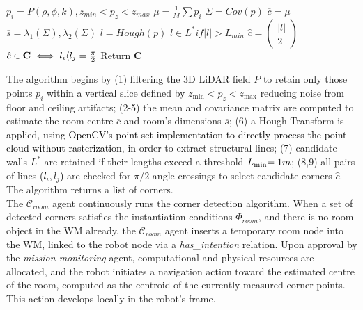 \documentclass[10pt,a4paper]{article}
\begin{document}
\begin{algorithm}[h!]
\caption{Corners Detector Algorithm}
\begin{algorithmic}[1]
    \State $p_i=P(\rho, \phi, k),  z_{min} <  p_z < z_{max}$
    \State $\mu = \frac{1}{M}\sum{p_i}$
    \State $\Sigma = Cov(p)$
    \State $\overline{c} = \mu$
    \State $\overline{s}=\lambda_1(\Sigma), \lambda_2(\Sigma)$
    \State $l=Hough(p)$
    \State $l\in L^* if |l| > L_{min}$
    \State $\hat{c}=\begin{pmatrix} |l| \\ 2 \end{pmatrix}$
    \State $\hat{c}\in \mathbf{C} \iff \textcolor{black}{l_i\langle l_j}=\frac{\pi}{2}$
    \State Return $\mathbf{C}$
\end{algorithmic}
\label{alg:room_detector}
\end{algorithm}

The algorithm begins by (1) filtering the 3D LiDAR field $P$ to retain only those points \(p_i\) within a vertical slice defined by \(z_{\min} < p_z < z_{\max}\) reducing noise from floor and ceiling artifacts; (2-5) the mean and covariance matrix are computed to estimate the room centre \(\overline{c}\) and room's dimensions $\overline{s}$; (6) a Hough Transform is applied, \textcolor{black}{using OpenCV’s point set implementation to directly process the point cloud without rasterization}, in order to extract structural lines; (7) candidate walls \(L^*\) are retained if their lengths exceed a threshold $L_{\text{min}}\textcolor{black}{=1m}$; (8,9) all pairs of lines \textcolor{black}{($l_i, l_j$)} are checked for $\pi/2$ angle crossings to select candidate corners \(\hat{c}\). The algorithm returns a list of corners. \\

%
%
%
%
%
%
%
%
%
%
%
%
%
%
%
%

The $\mathcal{C}_{room}$ agent continuously runs the corner detection algorithm.  When a set of detected corners satisfies the instantiation conditions \( \Phi_{room} \), and there is no room object in the WM already, the $\mathcal{C}_{room}$ agent inserts a temporary room node into the WM, linked to the robot node via a \textit{has\_intention} relation. Upon approval by the \textit{mission-monitoring} agent, computational and physical resources are allocated, and the robot initiates a navigation action toward the estimated centre of the room, computed as the centroid of the currently measured corner points. This action develops locally in the robot's frame.
\end{document}
